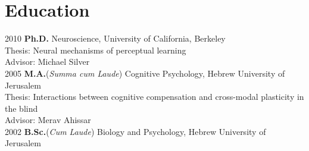 \documentclass[11pt,fullpage]{article}
\newcommand\tab[1][1cm]{\hspace*{#1}}
\begin{document}
\section*{Education}


	2010  {\bf Ph.D. } Neuroscience, University of California, Berkeley \\
     \tab Thesis: Neural mechanisms of perceptual learning\\
     \tab Advisor: Michael Silver \\
	2005  {\bf M.A.}(\emph{Summa cum Laude}) Cognitive Psychology, Hebrew University of Jerusalem \\
      \tab Thesis: Interactions between cognitive compensation and cross-modal plasticity in the blind \\
      \tab Advisor: Merav Ahissar \\
	2002  {\bf B.Sc.}(\emph{Cum Laude}) Biology and Psychology, Hebrew University of Jerusalem \\
\end{document}
